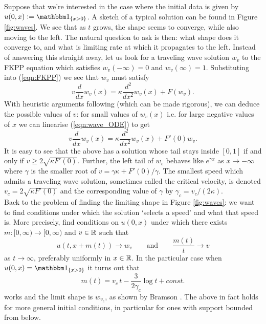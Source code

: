 Suppose that we're interested in the case where the initial data is given by $u(0, x) \defeq \Ind_{\{ x > 0\}}$. A sketch of a typical solution can be found in Figure \ref{fig:waves}. We see that as $t$ grows, the shape seems to converge, while also moving to the left. The natural question to ask is then: what shape does it converge to, and what is limiting rate at which it propagates to the left. Instead of answering this straight away, let us look for a traveling wave solution $w_v$ to the FKPP equation which satisfies $w_v(-\infty) = 0$ and $w_v(\infty) = 1$. Substituting into (\ref{eqn:FKPP}) we see that $w_v$ must satisfy
\begin{equation}\label{eqn:wave_ODE}
v \frac{d}{dx}w_v(x) = \kappa \frac{d^2}{dx^2} w_v (x) + F(w_v). 
\end{equation}
With heuristic arguments following \cite{brunet2015exactly} (which can be made rigorous), we can deduce the possible values of $v$: for small values of $w_v(x)$ i.e. for large negative values of $x$ we can linearise (\ref{eqn:wave_ODE}) to get
\begin{equation}\nonumber
v \frac{d}{dx}w_v(x) = \kappa \frac{d^2}{dx^2}w_v(x) + F'(0) w_v. 
\end{equation}
It is easy to see that the above has a solution whose tail stays inside $[0,1]$ if and only if $v \geq 2 \sqrt{\kappa F'(0)}$. Further, the left tail of $w_v$ behaves like $e^{\gamma x}$ as $x \to -\infty$ where $\gamma$ is the smaller root of $v = \gamma \kappa + F'(0) / \gamma$. The smallest speed which admits a traveling wave solution, sometimes called the critical velocity, is denoted $v_c = 2 \sqrt{\kappa F'(0)}$ and the corresponding value of $\gamma$ by $\gamma_c = v_c / (2 \kappa)$. \\

Back to the problem of finding the limiting shape in Figure \ref{fig:waves}: we want to find conditions under which the solution `selects a speed' and what that speed is. More precisely, find conditions on $u(0, x)$ under which there exists $m : [0, \infty) \to [0, \infty)$ and $v \in \mathbb{R}$ such that
\begin{equation}\nonumber
u(t, x + m(t)) \to w_v \qquad\text{and}\qquad \frac{m(t)}{t} \to v
\end{equation} 
as $t \to \infty$, preferably uniformly in $x \in \mathbb{R}$. In the particular case when $u(0, x) = \Ind_{\{ x > 0\}}$ it turns out that 
\begin{equation}\nonumber
m(t) = v_c\,t - \frac{3}{2 \gamma_c} \log t + const. 
\end{equation}
works and the limit shape is $w_{v_c}$, as shown by Bramson \cite{bramson1978maximal}. The above in fact holds for more general initial conditions, in particular for ones with support bounded from below. \\

